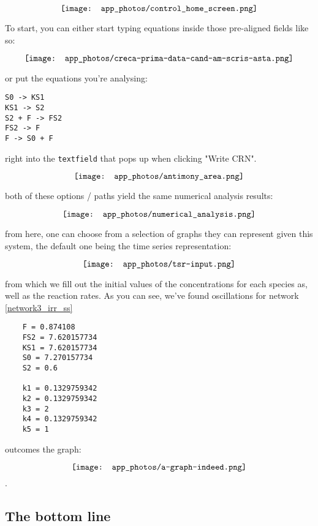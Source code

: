 \[
	\texttt{[image: app\_photos/control\_home\_screen.png]}\\
\]

To start, you can either start typing equations inside those pre-aligned fields like so:

\[
	\texttt{[image: app\_photos/creca-prima-data-cand-am-scris-asta.png]}\\
\]

or put the equations you're analysing:

\begin{lstlisting}
S0 -> KS1
KS1 -> S2
S2 + F -> FS2
FS2 -> F
F -> S0 + F
\end{lstlisting}

right into the \verb|textfield| that pops up when clicking "Write CRN".

\[
	\texttt{[image: app\_photos/antimony\_area.png]}\\
\]

both of these options / paths yield the same numerical analysis results:

\[
	\texttt{[image: app\_photos/numerical\_analysis.png]}\\
\]

from here, one can choose from a selection of graphs they can represent given this system, the default one being the time series representation:

\[
	\texttt{[image: app\_photos/tsr-input.png]}\\
\]

from which we fill out the initial values of the concentrations for each species as, well as the reaction rates. As you can see, we've found oscillations for network \ref{network3_irr_ss} \label{last_system_init_cond}
\begin{lstlisting}
    F = 0.874108
    FS2 = 7.620157734
    KS1 = 7.620157734
    S0 = 7.270157734
    S2 = 0.6

    k1 = 0.1329759342
    k2 = 0.1329759342
    k3 = 2
    k4 = 0.1329759342
    k5 = 1
\end{lstlisting}

outcomes the graph:

\[
	\texttt{[image: app\_photos/a-graph-indeed.png]}\\
\].

\subsection{The bottom line}

